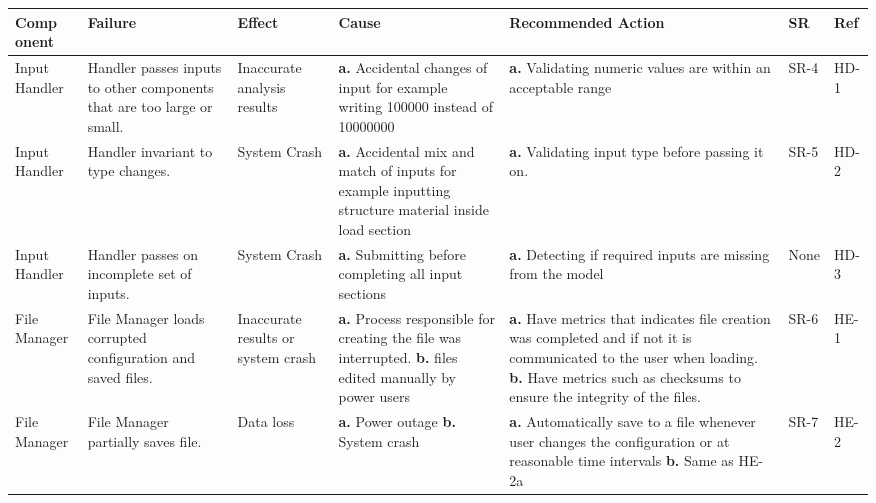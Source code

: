 \documentclass{article}
\begin{document}
\begin{landscape}
\begin{table}[H]
        \end{table}
        \pagebreak
        \begin{table}[H]
    \begin{tabular}{|p{} | p{} | p{} | p{} | p{} | p{} | p{}|}
            \toprule
            \textbf{Comp onent} & \textbf{Failure} & \textbf{Effect} & \textbf{Cause} & \textbf{Recommended Action} & \textbf{SR} & \textbf{Ref}\\
        \midrule
        Input Handler& Handler passes inputs to other components that are too large or small.
        & Inaccurate analysis results
        & \textbf{a.} Accidental changes of input for example writing 100000 instead of 10000000      
        & \textbf{a.} Validating numeric values are within an acceptable range   
        &SR-4&HD-1\\
        \midrule
        Input Handler& Handler invariant to type changes.
        & System Crash
        & \textbf{a.} Accidental mix and match of inputs for example inputting structure material inside load section
        & \textbf{a.} Validating input type before passing it on.    
        &SR-5&HD-2\\
        \midrule
        Input Handler& Handler passes on incomplete set of inputs.
        & System Crash
        & \textbf{a.} Submitting before completing all input sections     
        & \textbf{a.} Detecting if required inputs are missing from the model   
        &None&HD-3\\
        \midrule
        File Manager& File Manager loads corrupted configuration and saved files.
        & Inaccurate results or system crash
        & \textbf{a.} Process responsible for creating the file was interrupted.\newline
          \textbf{b.} files edited manually by power users
        & \textbf{a.} Have metrics that indicates file creation was completed and if not it is communicated to the user when loading.\newline
          \textbf{b.} Have metrics such as checksums to ensure the integrity of the files.  
        &SR-6&HE-1\\
        \midrule
        File Manager& File Manager partially saves file.
        & Data loss
        & \textbf{a.} Power outage\newline
          \textbf{b.} System crash        
        & \textbf{a.} Automatically save to a file whenever user changes the configuration or at reasonable time intervals\newline
        \textbf{b.} Same as HE-2a  
        &SR-7&HE-2\\
        \bottomrule
          \end{tabular}
          \end{table}

      
 
\end{landscape}
\end{document}
